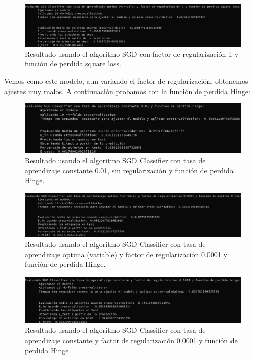 \documentclass[12pt, spanish]{article}
\begin{document}
\begin{figure}[H]
	\centering
	\hspace*{-1cm}\includegraphics[scale=0.4]{clasificacion/sgdLoss1.png}
	\caption{Resultado usando el algoritmo SGD con factor de regularización 1 y función de perdida square loss.}
	\label{SGDL1}
\end{figure}

\newpage

Vemos como este modelo, aun variando el factor de regularización, obtenemos ajustes muy malos. A continuación probamos con la función de perdida Hinge:

\begin{figure}[H]
	\centering
	\hspace*{-1cm}\includegraphics[scale=0.4]{clasificacion/sgdH001a0.png}
	\caption{Resultado usando el algoritmo SGD Classifier con tasa de aprendizaje constante 0.01, sin regularización y función de perdida Hinge.}
	\label{SGDL0}
\end{figure}

\begin{figure}[H]
	\centering
	\hspace*{-1cm}\includegraphics[scale=0.4]{clasificacion/sgdH00001.png}
	\caption{Resultado usando el algoritmo SGD Classifier con tasa de aprendizaje optima (variable) y factor de regularización 0.0001 y función de perdida Hinge.}
	\label{SGDL00001}
\end{figure}

\begin{figure}[H]
	\centering
	\hspace*{-1cm}\includegraphics[scale=0.4]{clasificacion/sgdH00001c.png}
	\caption{Resultado usando el algoritmo SGD Classifier con tasa de aprendizaje constante y factor de regularización 0.0001 y función de perdida Hinge.}
	\label{SGDL00001}
\end{figure}
\end{document}
